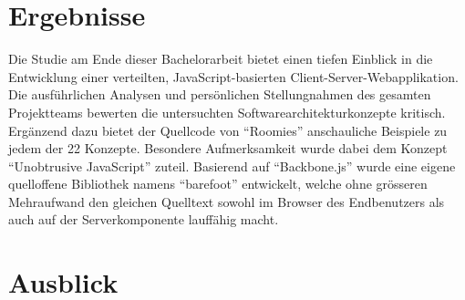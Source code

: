 \section{Ergebnisse}
Die Studie am Ende dieser Bachelorarbeit bietet einen tiefen Einblick in die Entwicklung einer verteilten, JavaScript-basierten Client-Server-Webapplikation. Die ausführlichen Analysen und persönlichen Stellungnahmen des gesamten Projektteams bewerten die untersuchten Softwarearchitekturkonzepte kritisch. Ergänzend dazu bietet der Quellcode von ``Roomies'' anschauliche Beispiele zu jedem der 22 Konzepte. Besondere Aufmerksamkeit wurde dabei dem Konzept ``Unobtrusive JavaScript'' zuteil. Basierend auf ``Backbone.js'' wurde eine eigene quelloffene Bibliothek namens ``barefoot'' entwickelt, welche ohne grösseren Mehraufwand den gleichen Quelltext sowohl im Browser des Endbenutzers als auch auf der Serverkomponente lauffähig macht.

\section{Ausblick}